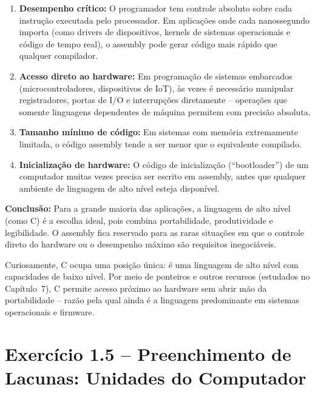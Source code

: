 \documentclass[12pt,a4paper]{article}
\begin{document}
\begin{respostabox}
\begin{enumerate}
  \item \textbf{Desempenho crítico:} O programador tem controle absoluto sobre cada
  instrução executada pelo processador. Em aplicações onde cada nanossegundo importa
  (como drivers de dispositivos, kernels de sistemas operacionais e código de tempo real),
  o assembly pode gerar código mais rápido que qualquer compilador.

  \item \textbf{Acesso direto ao hardware:} Em programação de sistemas embarcados
  (microcontroladores, dispositivos de IoT), às vezes é necessário manipular registradores,
  portas de I/O e interrupções diretamente -- operações que somente linguagens dependentes
  de máquina permitem com precisão absoluta.

  \item \textbf{Tamanho mínimo de código:} Em sistemas com memória extremamente limitada,
  o código assembly tende a ser menor que o equivalente compilado.

  \item \textbf{Inicialização de hardware:} O código de inicialização (``bootloader'')
  de um computador muitas vezes precisa ser escrito em assembly, antes que qualquer
  ambiente de linguagem de alto nível esteja disponível.
\end{enumerate}

\medskip
\textbf{Conclusão:} Para a grande maioria das aplicações, a linguagem de alto nível (como
C) é a escolha ideal, pois combina portabilidade, produtividade e legibilidade. O assembly
fica reservado para as raras situações em que o controle direto do hardware ou o desempenho
máximo são requisitos inegociáveis.

\end{respostabox}

\begin{portab}
  Curiosamente, C ocupa uma posição única: é uma linguagem de alto nível com capacidades
  de baixo nível. Por meio de ponteiros e outros recursos (estudados no Capítulo~7),
  C permite acesso próximo ao hardware sem abrir mão da portabilidade -- razão pela
  qual ainda é a linguagem predominante em sistemas operacionais e firmware.
\end{portab}

\newpage

\section{Exercício 1.5 -- Preenchimento de Lacunas: Unidades do Computador}
\end{document}

